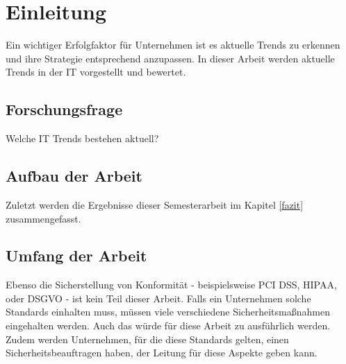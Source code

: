 \newpage
\section{Einleitung} \label{Einleitung}
Ein wichtiger Erfolgfaktor für Unternehmen ist es aktuelle Trends zu erkennen
und ihre Strategie entsprechend anzupassen. In dieser Arbeit werden aktuelle
Trends in der IT vorgestellt und bewertet.


\subsection{Forschungsfrage}
Welche IT Trends bestehen aktuell?

\subsection{Aufbau der Arbeit}

Zuletzt werden die Ergebnisse dieser Semesterarbeit im Kapitel \ref{fazit} zusammengefasst.

\subsection{Umfang der Arbeit}

Ebenso die Sicherstellung von Konformität - beispielsweise PCI DSS, HIPAA, oder
DSGVO - ist kein Teil dieser Arbeit. Falls ein Unternehmen solche
Standards einhalten muss, müssen viele verschiedene Sicherheitsmaßnahmen
eingehalten werden. Auch das würde für diese Arbeit zu ausführlich werden. Zudem
werden Unternehmen, für die diese Standards gelten, einen Sicherheitsbeauftragen
haben, der Leitung für diese Aspekte geben kann.
